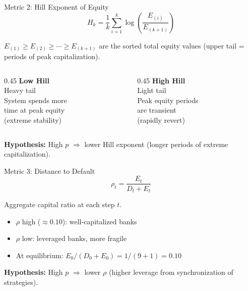 \documentclass[11pt]{beamer}
\begin{document}
\begin{frame}{Metric 2: Hill Exponent of Equity}
\centering
\Large
\[
H_k = \frac{1}{k} \sum_{i=1}^{k} \log\left( \frac{E_{(i)}}{E_{(k+1)}} \right)
\]

\vspace{0.5em}
\normalsize
\noindent
$E_{(1)} \geq E_{(2)} \geq \cdots \geq E_{(k+1)}$ are the sorted
total equity values (upper tail = periods of peak capitalization).

\vspace{1em}
\begin{columns}
\begin{column}{0.45\textwidth}
\centering
\textbf{Low Hill}\\
Heavy tail\\
System spends more\\
time at peak equity\\
(extreme stability)
\end{column}
\begin{column}{0.45\textwidth}
\centering
\textbf{High Hill}\\
Light tail\\
Peak equity periods\\
are transient\\
(rapidly revert)
\end{column}
\end{columns}

\vspace{0.5em}
\noindent\textbf{Hypothesis:} High $p$ $\Rightarrow$ lower Hill exponent (longer periods of extreme capitalization).
\end{frame}

\begin{frame}{Metric 3: Distance to Default}
\centering
\Large
\[
\rho_t = \frac{E_t}{D_t + E_t}
\]

\vspace{0.5em}
\normalsize
\noindent
Aggregate capital ratio at each step $t$.

\vspace{1em}
\begin{itemize}
    \item $\rho$ high ($\approx 0.10$): well-capitalized banks
    \item $\rho$ low: leveraged banks, more fragile
    \item At equilibrium: $E_0 / (D_0 + E_0) = 1 / (9 + 1) = 0.10$
\end{itemize}

\vspace{0.5em}
\noindent\textbf{Hypothesis:} High $p$ $\Rightarrow$ lower $\rho$ (higher leverage
from synchronization of strategies).
\end{frame}
\end{document}
